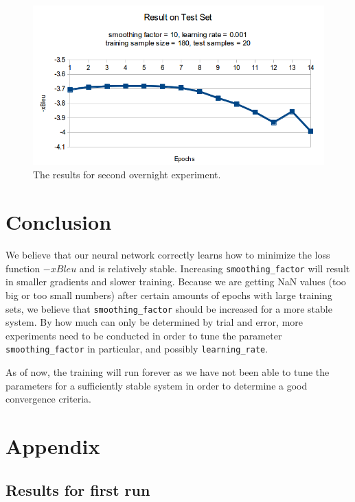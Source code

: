 \documentclass[a4paper]{article}
\begin{document}
\begin{figure}
\label{training}
\caption{The results for second overnight experiment.}
\centering
\includegraphics[width=\linewidth]{Smoothing10_200-training-samples_graph}
\end{figure}

\section{Conclusion}
We believe that our neural network correctly learns how to minimize the loss function $-xBleu$ and is relatively stable. Increasing \verb|smoothing_factor| will result in smaller gradients and slower training. Because we are getting NaN values (too big or too small numbers) after certain amounts of epochs with large training sets, we believe that \verb|smoothing_factor| should be increased for a more stable system. By how much can only be determined by trial and error, more experiments need to be conducted in order to tune the parameter \verb|smoothing_factor| in particular, and possibly \verb|learning_rate|. 

As of now, the training will run forever as we have not been able to tune the parameters for a sufficiently stable system in order to determine a good convergence criteria.




\pagebreak

\let\cleardoublepage\clearpage

\appendix

\section{Appendix}

\subsection{Results for first run}
\end{document}
